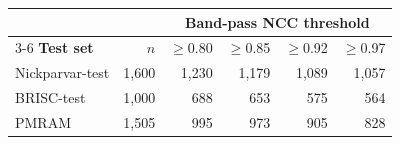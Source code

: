 \begin{tabular}{l r r r r r }
\toprule
 & & \multicolumn{4}{c}{\textbf{Band-pass NCC threshold}} \\
\cmidrule(lr){3-6}
\textbf{Test set} & $n$ & $\ge$0.80 & $\ge$0.85 & $\ge$0.92 & $\ge$0.97 \\
\midrule
Nickparvar-test & 1,600 & 1,230 & 1,179 & 1,089 & 1,057 \\
BRISC-test & 1,000 & 688 & 653 & 575 & 564 \\
PMRAM & 1,505 & 995 & 973 & 905 & 828 \\
\bottomrule
\end{tabular}
